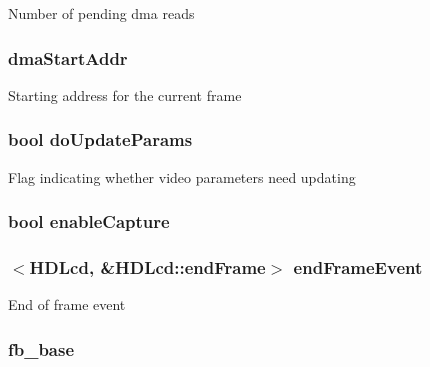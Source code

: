 Number of pending dma reads \hypertarget{classHDLcd_ae74c38d13416c4966fdd5c7db4678607}{
\subsubsection[{dmaStartAddr}]{ {\bf dmaStartAddr}}}
\label{classHDLcd_ae74c38d13416c4966fdd5c7db4678607}
Starting address for the current frame \hypertarget{classHDLcd_ad49d02ec4064ddf6d7055dcdc6128e20}{
\subsubsection[{doUpdateParams}]{\setlength{\rightskip}{0pt plus 5cm}bool {\bf doUpdateParams}}}
\label{classHDLcd_ad49d02ec4064ddf6d7055dcdc6128e20}
Flag indicating whether video parameters need updating \hypertarget{classHDLcd_abf8ed1a0152ea70d689ffce800cd32fd}{
\subsubsection[{enableCapture}]{\setlength{\rightskip}{0pt plus 5cm}bool {\bf enableCapture}}}
\label{classHDLcd_abf8ed1a0152ea70d689ffce800cd32fd}
\hypertarget{classHDLcd_afec13618cf33587eef480a7e70dece76}{
\subsubsection[{endFrameEvent}]{$<${\bf HDLcd}, \&HDLcd::endFrame$>$ {\bf endFrameEvent}}}
\label{classHDLcd_afec13618cf33587eef480a7e70dece76}
End of frame event \hypertarget{classHDLcd_ad9fd5ba71c5b40acdb6fd9adc4fa408b}{
\subsubsection[{fb\_\-base}]{ {\bf fb\_\-base}}}
